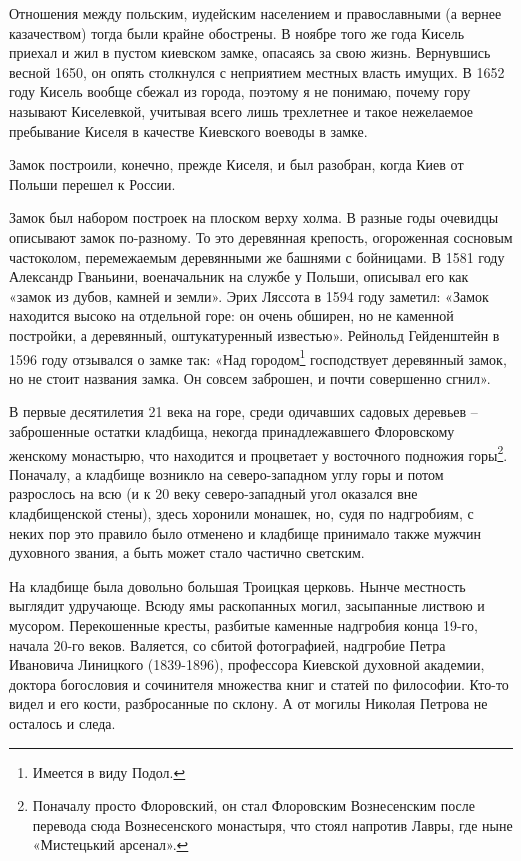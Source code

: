 Отношения между польским, иудейским населением и православными (а вернее казачеством) тогда были крайне обострены. В ноябре того же года Кисель приехал и жил в пустом киевском замке, опасаясь за свою жизнь. Вернувшись весной 1650, он опять столкнулся с неприятием местных власть имущих. В 1652 году Кисель вообще сбежал из города, поэтому я не понимаю, почему гору называют Киселевкой, учитывая всего лишь трехлетнее и такое нежелаемое пребывание Киселя в качестве Киевского воеводы в замке.
 
Замок построили, конечно, прежде Киселя, и был разобран, когда Киев от Польши перешел к России.

Замок был набором построек на плоском верху холма. В разные годы очевидцы описывают замок по-разному. То это деревянная крепость, огороженная сосновым частоколом, перемежаемым деревянными же башнями с бойницами. В 1581 году Александр Гваньини, военачальник на службе у Польши, описывал его как «замок из дубов, камней и земли». Эрих Ляссота в 1594 году заметил: «Замок находится высоко на отдельной горе: он очень обширен, но не каменной постройки, а деревянный, оштукатуренный известью». Рейнольд Гейденштейн в 1596 году отзывался о замке так: «Над городом\footnote{Имеется в виду Подол.} господствует деревянный замок, но не стоит названия замка. Он совсем заброшен, и почти совершенно сгнил».

В первые десятилетия 21 века на горе, среди одичавших садовых деревьев – заброшенные остатки кладбища, некогда принадлежавшего Флоровскому женскому монастырю, что находится и процветает у восточного подножия горы\footnote{Поначалу просто Флоровский, он стал Флоровским Вознесенским после перевода сюда Вознесенского монастыря, что стоял напротив Лавры, где ныне «Мистецький арсенал».}. Поначалу, а кладбище возникло на северо-западном углу горы и потом разрослось на всю (и к 20 веку северо-западный угол оказался вне кладбищенской стены), здесь хоронили монашек, но, судя по надгробиям, с неких пор это правило было отменено и кладбище принимало также мужчин духовного звания, а быть может стало частично светским.

На кладбище была довольно большая Троицкая церковь. Нынче местность выглядит удручающе. Всюду ямы раскопанных могил, засыпанные листвою и мусором. Перекошенные кресты, разбитые каменные надгробия конца 19-го, начала 20-го веков. Валяется, со сбитой фотографией, надгробие Петра Ивановича Линицкого (1839-1896), профессора Киевской духовной академии, доктора богословия и сочинителя множества книг и статей по философии. Кто-то видел и его кости, разбросанные по склону. А от могилы Николая Петрова не осталось и следа.

